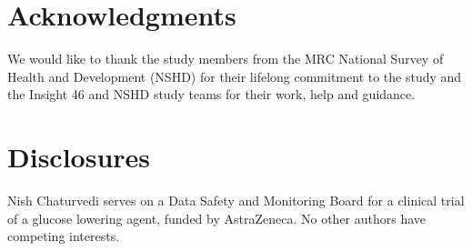 \documentclass[12pt]{spieman}  %
\begin{document}
\begin{spacing}{2}
\section*{Acknowledgments}
We would like to thank the study members from the MRC National Survey of Health and Development (NSHD) for their lifelong commitment to the study and the Insight 46 and NSHD study teams for their work, help and guidance.



\section*{Disclosures}
Nish Chaturvedi serves on a Data Safety and Monitoring Board for a clinical trial of a glucose lowering agent, funded by AstraZeneca. No other authors have competing interests.









\end{spacing}
\end{document}
